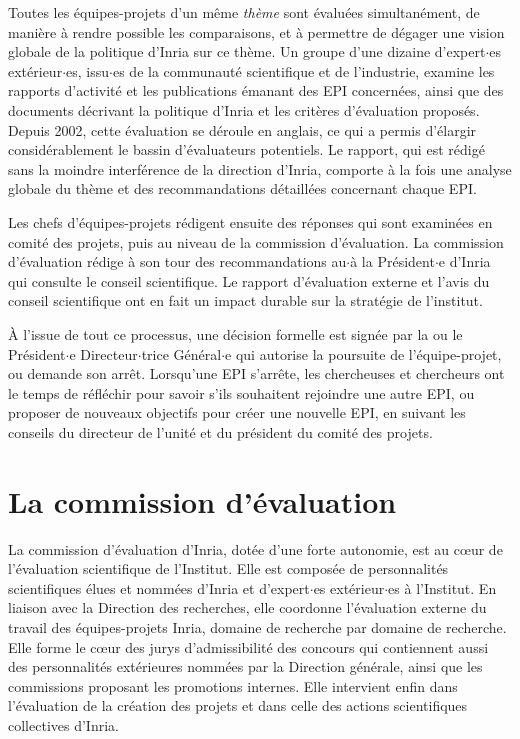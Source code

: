 Toutes les \'equipes-projets d'un m\^eme \textsl{th\`eme} sont
\'evalu\'ees simultan\'ement, de mani\`ere \`a rendre possible les
comparaisons, et \`a permettre de d\'egager une vision globale de la
politique d'Inria sur ce th\`eme. Un groupe d'une dizaine
d'expert$\cdot$es ext\'erieur$\cdot$es, issu$\cdot$es de la communaut\'e scientifique et de
l'industrie, examine les rapports d'activit\'e et les publications
\'emanant des EPI concern\'ees, ainsi que des documents d\'ecrivant
la politique d'Inria et les crit\`eres d'\'evaluation propos\'es.
Depuis 2002, cette \'evaluation se d\'eroule en anglais, ce qui a
permis d'\'elargir consid\'erablement le bassin d'\'evaluateurs
potentiels. Le rapport, qui est r\'edig\'e sans la moindre
interf\'erence de la direction d'Inria, comporte \`a la fois une
analyse globale du th\`eme et des recommandations d\'etaill\'ees
concernant chaque EPI.

Les chefs d'\'equipes-projets r\'edigent ensuite des r\'eponses qui sont
examin\'ees en comit\'e des projets, puis au niveau de la commission
d'\'evaluation. La commission d'\'evaluation r\'edige \`a son tour
des recommandations au$\cdot$\`a la Pr\'esident$\cdot$e d'Inria qui consulte le
conseil scientifique. Le rapport d'\'evaluation externe et l'avis
du conseil scientifique ont en fait un impact durable sur la
strat\'egie de l'institut.

\`A l'issue de tout ce processus, une d\'ecision formelle est sign\'ee
par la ou le Pr\'esident$\cdot$e Directeur$\cdot$trice G\'en\'eral$\cdot$e qui autorise la poursuite
de l'\'equipe-projet, ou demande son arr\^et. Lorsqu'une EPI s'arr\^ete, les
chercheuses et chercheurs ont le temps de r\'efl\'echir pour savoir s'ils
souhaitent rejoindre une autre EPI, ou proposer de nouveaux
objectifs pour cr\'eer une nouvelle EPI, en suivant les conseils du
directeur de l'unit\'e et du pr\'esident du comit\'e des projets.

\section{La commission d'\'evaluation}

La commission d'\'evaluation d'Inria, dot\'ee d'une forte autonomie, est au c{\oe}ur de l'\'evaluation scientifique de l'Institut. Elle est compos\'ee de personnalit\'es scientifiques \'elues et nomm\'ees d'Inria et d'expert$\cdot$es ext\'erieur$\cdot$es \`a l'Institut. En liaison avec la Direction des recherches, elle coordonne l'\'evaluation externe du travail des \'equipes-projets Inria, domaine de recherche par domaine de recherche. Elle forme le c\oe ur des jurys d'admissibilit\'e des concours qui contiennent aussi des personnalit\'es ext\'erieures nomm\'ees par la Direction g\'en\'erale, ainsi que les commissions proposant les promotions internes. Elle intervient enfin dans l'\'evaluation de la cr\'eation des projets et dans celle des actions scientifiques collectives d'Inria.

